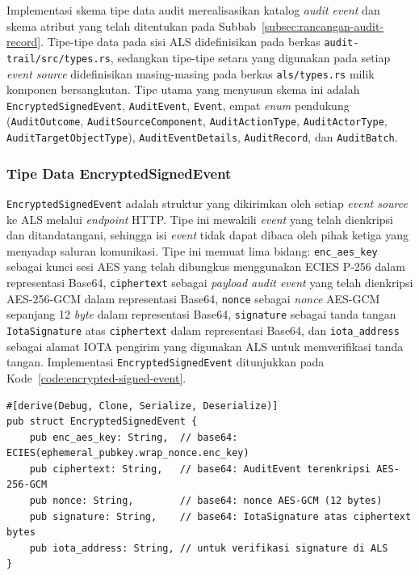 Implementasi skema tipe data audit merealisasikan katalog \textit{audit event}
dan skema atribut yang telah ditentukan pada Subbab~\ref{subsec:rancangan-audit-record}.
Tipe-tipe data pada sisi ALS didefinisikan pada berkas
\texttt{audit-trail/src/types.rs}, sedangkan tipe-tipe setara yang digunakan
pada setiap \textit{event source} didefinisikan masing-masing pada berkas
\texttt{als/types.rs} milik komponen bersangkutan. Tipe utama yang menyusun
skema ini adalah \texttt{EncryptedSignedEvent}, \texttt{AuditEvent}, \texttt{Event},
empat \textit{enum} pendukung (\texttt{AuditOutcome}, \texttt{AuditSourceComponent},
\texttt{AuditActionType}, \texttt{AuditActorType}, \texttt{AuditTargetObjectType}),
\texttt{AuditEventDetails}, \texttt{AuditRecord}, dan \texttt{AuditBatch}.

\subsubsection{Tipe Data EncryptedSignedEvent}

\texttt{EncryptedSignedEvent} adalah struktur yang dikirimkan oleh setiap
\textit{event source} ke ALS melalui \textit{endpoint} HTTP. Tipe ini mewakili
\textit{event} yang telah dienkripsi dan ditandatangani, sehingga isi
\textit{event} tidak dapat dibaca oleh pihak ketiga yang menyadap saluran
komunikasi. Tipe ini memuat lima bidang: \texttt{enc\_aes\_key} sebagai kunci
sesi AES yang telah dibungkus menggunakan ECIES P-256 dalam representasi Base64,
\texttt{ciphertext} sebagai \textit{payload audit event} yang telah dienkripsi
AES-256-GCM dalam representasi Base64, \texttt{nonce} sebagai \textit{nonce}
AES-GCM sepanjang 12 \textit{byte} dalam representasi Base64, \texttt{signature}
sebagai tanda tangan \texttt{IotaSignature} atas \texttt{ciphertext} dalam
representasi Base64, dan \texttt{iota\_address} sebagai alamat IOTA pengirim
yang digunakan ALS untuk memverifikasi tanda tangan. Implementasi
\texttt{EncryptedSignedEvent} ditunjukkan pada Kode~\ref{code:encrypted-signed-event}.

\begin{listing}[ht]
\caption{Implementasi \texttt{EncryptedSignedEvent}}
\label{code:encrypted-signed-event}
\begin{verbatim}
#[derive(Debug, Clone, Serialize, Deserialize)]
pub struct EncryptedSignedEvent {
    pub enc_aes_key: String,  // base64: ECIES(ephemeral_pubkey.wrap_nonce.enc_key)
    pub ciphertext: String,   // base64: AuditEvent terenkripsi AES-256-GCM
    pub nonce: String,        // base64: nonce AES-GCM (12 bytes)
    pub signature: String,    // base64: IotaSignature atas ciphertext bytes
    pub iota_address: String, // untuk verifikasi signature di ALS
}
\end{verbatim}
\end{listing}

